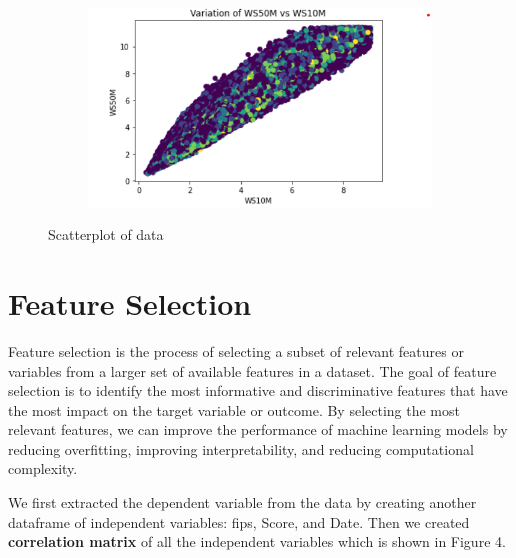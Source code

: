 \documentclass{article}
\begin{document}
\begin{figure}[htbp]
\begin{subfigure}{0.3\textwidth}
    \end{subfigure}
    \begin{subfigure}{0.3\textwidth}
        \centering
        \includegraphics[width=\linewidth]{pic/scatter/VARIANCE OF WS50M VS WS10M.png}
    \end{subfigure}
\caption{Scatterplot of data}
\label{fig: Scatterplot of Data}
\end{figure}

\section{Feature Selection}

Feature selection is the process of selecting a subset of relevant features or variables from a larger set of available features in a dataset. The goal of feature selection is to identify the most informative and discriminative features that have the most impact on the target variable or outcome. By selecting the most relevant features, we can improve the performance of machine learning models by reducing overfitting, improving interpretability, and reducing computational complexity.

We first extracted the dependent variable from the data by creating another dataframe of independent variables: fips, Score, and Date.
Then we created \textbf{correlation matrix} of all the independent variables which is shown in Figure 4.
\end{document}
